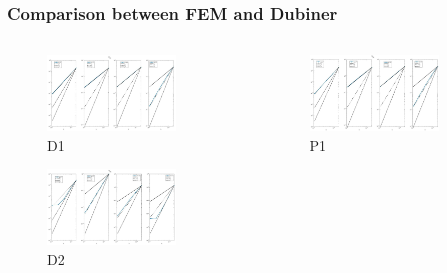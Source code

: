 \documentclass[8pt]{beamer}
\begin{document}
\begin{frame}
\frametitle{Comparison between FEM and Dubiner}
\begin{columns}
	\begin{column}{0.5\textwidth}
	\begin{figure}[h]
	\includegraphics[width=0.8\textwidth]{D1_Vm_1.jpg} \caption{D1}
	\end{figure}
    \vspace{-4mm}
    \begin{figure}[h]
	\includegraphics[width=0.8\textwidth]{D2_Vm_1.jpg} \caption{D2}
	\end{figure}
    \end{column}
    \begin{column}{0.5\textwidth}
    \begin{figure}[h]
	\includegraphics[width=0.8\textwidth]{P1_Vm_1.jpg} \caption{P1}

\end{figure}
\end{column}
\end{columns}
\end{frame}
\end{document}
